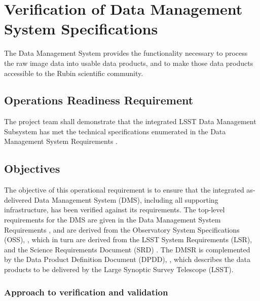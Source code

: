 

\section{Verification of Data Management System Specifications}  \label{sec:dm}

The Data Management System provides the functionality necessary to process the raw image data into usable data products, and to make those data products accessible to the Rubin scientific community.

\subsection{Operations Readiness Requirement}
The project team shall demonstrate that the integrated LSST Data Management Subsystem has met the technical specifications enumerated in the  Data Management System Requirements  . 

\subsection{Objectives}
The objective of this operational requirement is to ensure that the integrated as-delivered Data Management System (DMS), including all supporting infrastructure, has been verified against its requirements. 
The top-level requirements for the DMS are given in the Data Management System Requirements  , and are derived from the Observatory System Specifications (OSS), , which in turn are derived from the LSST System Requirements (LSR),  and the Science Requirements Document (SRD) . 
The DMSR is complemented by the Data Product Definition Document (DPDD), ,  which describes the data products to be delivered by the Large Synoptic Survey Telescope (LSST).

\subsubsection{Approach to verification and validation}\label{sec:dm-approach}

